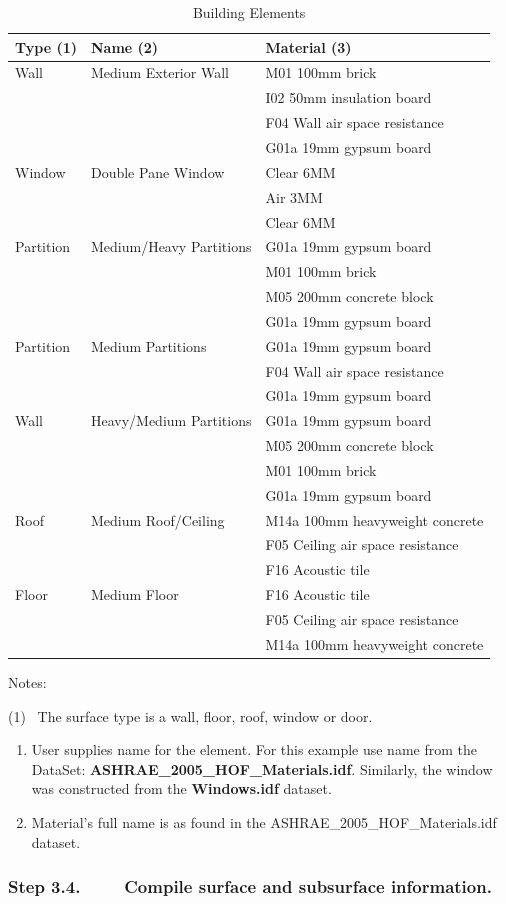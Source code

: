 \begin{longtable}[c]{@{}lll@{}}
\caption{Building Elements \protect \label{table:building-elements}}\\
\toprule 
Type (1) & Name (2) & Material (3) \tabularnewline \midrule
\endhead
Wall & Medium Exterior Wall & M01 100mm brick \tabularnewline
~ & ~ & I02 50mm insulation board \tabularnewline
~ & ~ & F04 Wall air space resistance \tabularnewline
~ & ~ & G01a 19mm gypsum board \tabularnewline
Window & Double Pane Window & Clear 6MM \tabularnewline
~ & ~ & Air 3MM \tabularnewline
~ & ~ & Clear 6MM \tabularnewline
Partition & Medium/Heavy Partitions & G01a 19mm gypsum board \tabularnewline
~ & ~ & M01 100mm brick \tabularnewline
~ & ~ & M05 200mm concrete block \tabularnewline
~ & ~ & G01a 19mm gypsum board \tabularnewline
Partition & Medium Partitions & G01a 19mm gypsum board \tabularnewline
~ & ~ & F04 Wall air space resistance \tabularnewline
~ & ~ & G01a 19mm gypsum board \tabularnewline
Wall & Heavy/Medium Partitions & G01a 19mm gypsum board \tabularnewline
~ & ~ & M05 200mm concrete block \tabularnewline
~ & ~ & M01 100mm brick \tabularnewline
~ & ~ & G01a 19mm gypsum board \tabularnewline
Roof & Medium Roof/Ceiling & M14a 100mm heavyweight concrete \tabularnewline
~ & ~ & F05 Ceiling air space resistance \tabularnewline
~ & ~ & F16 Acoustic tile \tabularnewline
Floor & Medium Floor & F16 Acoustic tile \tabularnewline
~ & ~ & F05 Ceiling air space resistance \tabularnewline
~ & ~ & M14a 100mm heavyweight concrete \tabularnewline
\bottomrule
\end{longtable}

Notes:

(1)~ The surface type is a wall, floor, roof, window or door.

\begin{enumerate}
\def\labelenumi{(\arabic{enumi})}
\setcounter{enumi}{1}
\item
  User supplies name for the element. For this example use name from the DataSet: \textbf{ASHRAE\_2005\_HOF\_Materials.idf}. Similarly, the window was constructed from the \textbf{Windows.idf} dataset.
\item
  Material's full name is as found in the ASHRAE\_2005\_HOF\_Materials.idf dataset.
\end{enumerate}

\subsubsection{Step 3.4.~~~~ Compile surface and subsurface information.}\label{step-3.4.-compile-surface-and-subsurface-information.}

